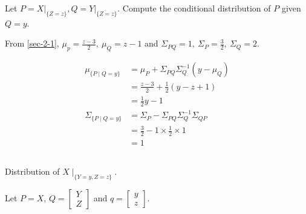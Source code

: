\documentclass{article}
\theoremstyle{definition} %
\begin{document}
Let $P=\left.X\right|_{\{Z=z\}}, Q=\left.Y\right|_{\{Z=z\}}$. Compute the conditional distribution of $P$ given $Q=y$.

From \ref{sec-2-1}, $\mu_p=\frac{z-3}{2}, \  \mu_Q=z-1$
    and $\Sigma_{P Q}=1, \  \Sigma_P=\frac{3}{2}, \  \Sigma_Q=2$.

\begin{align*}
    \mu_{\{P \mid Q=y\}}&=\mu_P+\Sigma_{P Q} \Sigma_Q^{-1}\left(y-\mu_Q\right)\\
    &=\frac{z-3}{2}+\frac{1}{2}(y-z+1)\\
    &=\frac{1}{2} y-1\\
    \Sigma_{\{P \mid Q=y\}}&=\Sigma_P-\Sigma_{P Q} \Sigma_Q^{-1} \Sigma_{Q P}\\
    &=\frac{3}{2}-1 \times \frac{1}{2} \times 1\\
    &=1
\end{align*}

\subsection{}

Distribution of $X \mid _{\{Y=y, Z=z\}}$.

Let $P=X$, $Q = \begin{bmatrix}
    Y\\Z
\end{bmatrix}$ and $q=\begin{bmatrix}
    y\\z
\end{bmatrix}$.
\end{document}

